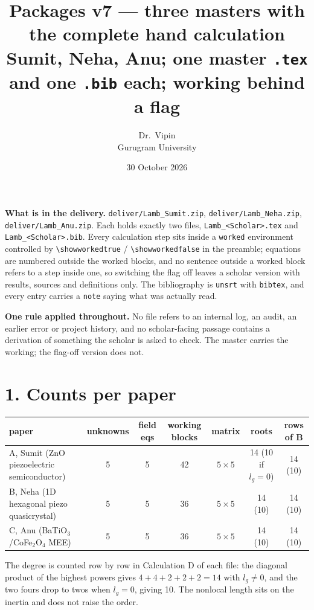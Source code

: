 \documentclass[11pt]{article}
\title{\vspace{-1.4cm}\textbf{Packages v7 --- three masters with the complete hand calculation}\\[2pt]
\large Sumit, Neha, Anu; one master \texttt{.tex} and one \texttt{.bib} each; working behind a flag}
\author{Dr.\ Vipin \\ Gurugram University}
\date{30 October 2026}
\begin{document}
\maketitle
\vspace{-6mm}
\footnotesize

\noindent\textbf{What is in the delivery.} \texttt{deliver/Lamb\_Sumit.zip},
\texttt{deliver/Lamb\_Neha.zip}, \texttt{deliver/Lamb\_Anu.zip}. Each holds exactly two files,
\texttt{Lamb\_<Scholar>.tex} and \texttt{Lamb\_<Scholar>.bib}. Every calculation step sits inside a
\texttt{worked} environment controlled by \verb|\showworkedtrue| / \verb|\showworkedfalse| in the preamble;
equations are numbered outside the worked blocks, and no sentence outside a worked block refers to a step
inside one, so switching the flag off leaves a scholar version with results, sources and definitions only.
The bibliography is \texttt{unsrt} with \texttt{bibtex}, and every entry carries a \texttt{note} saying what
was actually read.

\medskip
\noindent\textbf{One rule applied throughout.} No file refers to an internal log, an audit, an earlier
error or project history, and no scholar-facing passage contains a derivation of something the scholar is
asked to check. The master carries the working; the flag-off version does not.

\section*{1. Counts per paper}

\begin{center}
\begin{tabular}{lcccccc}
\toprule
paper & unknowns & field eqs & working blocks & matrix & roots & rows of $\mathbf B$\\
\midrule
A, Sumit (ZnO piezoelectric semiconductor) & 5 & 5 & 42 & $5\times5$ & 14 (10 if $l_g=0$) & 14 (10)\\
B, Neha (1D hexagonal piezo quasicrystal) & 5 & 5 & 36 & $5\times5$ & 14 (10) & 14 (10)\\
C, Anu (BaTiO$_3$/CoFe$_2$O$_4$ MEE) & 5 & 5 & 36 & $5\times5$ & 14 (10) & 14 (10)\\
\bottomrule
\end{tabular}
\end{center}

The degree is counted row by row in Calculation D of each file: the diagonal product of the highest powers
gives $4+4+2+2+2=14$ with $l_g\ne0$, and the two fours drop to twos when $l_g=0$, giving 10. The nonlocal
length sits on the inertia and does not raise the order.
\end{document}
